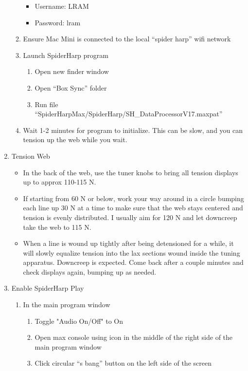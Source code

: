 \documentclass{ol-softwaremanual}
\begin{document}
\begin{enumerate}
\begin{enumerate}
        \begin{itemize}
            \item Username: LRAM
            \item Password: lram
        \end{itemize}
        \item Ensure Mac Mini is connected to the local ``spider harp'' wifi network
        \item Launch SpiderHarp program
        \begin{enumerate}
            \item Open new finder window
            \item Open ``Box Sync'' folder
            \item Run file ``SpiderHarpMax/SpiderHarp/SH\_DataProcessorV17.maxpat''
        \end{enumerate}
        \item Wait 1-2 minutes for program to initialize.  This can be slow, and you can tension up the web while you wait.
    \end{enumerate}
    \item Tension Web
    \begin{itemize}
        \item In the back of the web, use the tuner knobs to bring all tension displays up to approx 110-115 N.
        \item If starting from 60 N or below, work your way around in a circle bumping each line up 30 N at a time to make sure that the web stays centered and tension is evenly distributed. I usually aim for 120 N and let downcreep take the web to 115 N.
        \item When a line is wound up tightly after being detensioned for a while, it will slowly equalize tension into the lax sections wound inside the tuning apparatus.  Downcreep is expected.  Come back after a couple minutes and check displays again, bumping up as needed.
    \end{itemize}
    \item Enable SpiderHarp Play
    \begin{enumerate}
        \item In the main program window
        \begin{enumerate}
            \item Toggle "Audio On/Off" to On
            \item Open max console using icon in the middle of the right side of the main program window
            \item Click circular ``s bang'' button on the left side of the screen

\end{enumerate}
\end{enumerate}
\end{enumerate}
\end{document}
